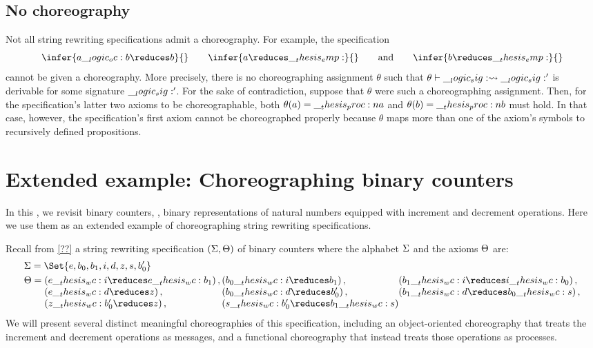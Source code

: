 \clearpage
\subsection{No choreography}

Not all string rewriting specifications admit a choreography.
For example, the specification
\begin{equation*}
  \infer{a \oc b \reduces b}{}
  \qquad
  \infer{a \reduces \emp}{}
  \qquad\text{and}\qquad
  \infer{b \reduces \emp}{}
\end{equation*}
cannot be given a choreography.
More precisely, there is no choreographing assignment $\theta$ such that $\theta \vdash \__logic_sig: \rightsquigarrow \__logic_sig:'$ is derivable for some signature $\__logic_sig:'$.
For the sake of contradiction, suppose that $\theta$ were such a choreographing assignment.
Then, for the specification's latter two axioms to be choreographable, both $\theta(a) = \__thesis_proc:n {a}$ and $\theta(b) = \__thesis_proc:n {b}$ must hold.
In that case, however, the specification's first axiom cannot be choreographed properly because $\theta$ maps more than one of the axiom's symbols to recursively defined propositions.



\section{Extended example: Choreographing binary counters}\label{sec:formula-as-process:counters}

In this , we revisit binary counters, \ie, binary representations of natural numbers equipped with increment and decrement operations.
Here we use them as an extended example of choreographing string rewriting specifications.

Recall from \cref{??} a string rewriting specification $(\Sigma, \Theta)$ of binary counters where the alphabet $\Sigma$ and the axioms $\Theta$ are:
\begin{equation*}
  \begin{lgathered}
    \sralph = \Set{e, b_0, b_1, i, d, z, s, b'_0}
    \\
    \srsig
      = \begin{array}[t]{@{}l@{}l@{}l@{}}
          (e \wc i \reduces e \wc b_1) \,, {} &
          (b_0 \wc i \reduces b_1) \,, &
          (b_1 \wc i \reduces i \wc b_0) \,, \\
          (e \wc d \reduces z) \,, &
          (b_0 \wc d \reduces b'_0) \,, {} &
          (b_1 \wc d \reduces b_0 \wc s) \,, \\
          (z \wc b'_0 \reduces z) \,, &
          (s \wc b'_0 \reduces b_1 \wc s)
        \end{array}
  \end{lgathered}
\end{equation*}
We will present several distinct meaningful choreographies of this specification, including an object-oriented choreography that treats the increment and decrement operations as messages, and a functional choreography that instead treats those operations as processes. 


